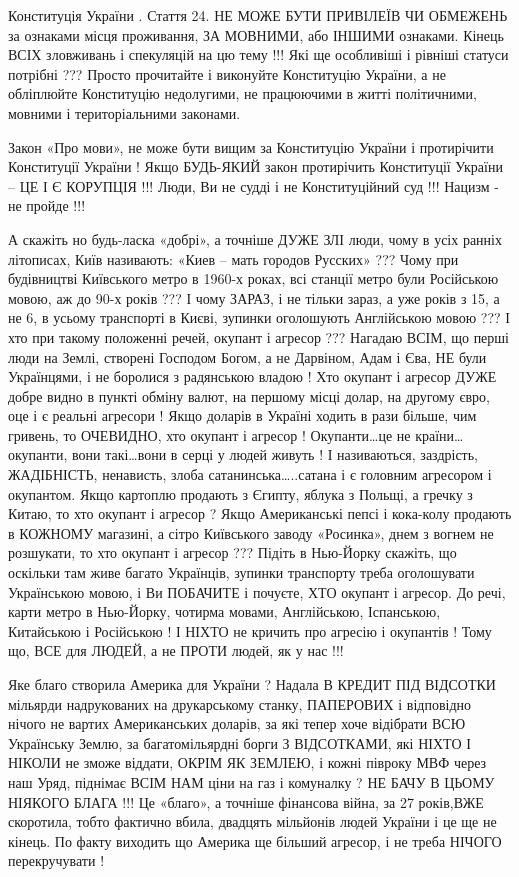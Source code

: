 \begin{itemize}
Конституція України . Стаття 24. НЕ МОЖЕ БУТИ ПРИВІЛЕЇВ ЧИ ОБМЕЖЕНЬ за ознаками
місця проживання, ЗА МОВНИМИ, або ІНШИМИ ознаками. Кінець ВСІХ зловживань і
спекуляцій на цю тему !!! Які ще особливіші і рівніші статуси потрібні ???
Просто прочитайте і виконуйте Конституцію України, а не обліплюйте Конституцію
недолугими, не працюючими в житті політичними, мовними і територіальними
законами.

Закон «Про мови», не може бути вищим за Конституцію України і протирічити
Конституції України ! Якщо БУДЬ-ЯКИЙ закон протирічить Конституції України – ЦЕ
І Є КОРУПЦІЯ !!! Люди, Ви не судді і не Конституційний суд !!! Нацизм - не
пройде !!!

А скажіть но будь-ласка «добрі», а точніше ДУЖЕ ЗЛІ люди, чому в усіх ранніх
літописах, Київ називають: «Киев – мать городов Русских» ??? Чому при
будівництві Київського метро в 1960-х роках, всі станції метро були Російською
мовою, аж до 90-х років ??? І чому ЗАРАЗ, і не тільки зараз, а уже років з 15,
а не 6, в усьому транспорті в Києві, зупинки оголошують Англійською мовою ??? І
хто при такому положенні речей, окупант і агресор ??? Нагадаю ВСІМ, що перші
люди на Землі, створені Господом Богом, а не Дарвіном, Адам і Єва, НЕ були
Українцями, і не боролися з радянською владою ! Хто окупант і агресор ДУЖЕ
добре видно в пункті обміну валют, на першому місці долар, на другому євро, оце
і є реальні агресори ! Якщо доларів в Україні ходить в рази більше, чим
гривень, то ОЧЕВИДНО, хто окупант і агресор ! Окупанти…це не країни…окупанти,
вони такі…вони в серці у людей живуть ! І називаються, заздрість, ЖАДІБНІСТЬ,
ненависть, злоба сатанинська…..сатана і є головним агресором і окупантом. Якщо
картоплю продають з Єгипту, яблука з Польщі, а гречку з Китаю, то хто окупант і
агресор ? Якщо Американські пепсі і кока-колу продають в КОЖНОМУ магазині, а
сітро Київського заводу «Росинка», днем з вогнем не розшукати, то хто окупант і
агресор ??? Підіть в Нью-Йорку скажіть, що оскільки там живе багато Українців,
зупинки транспорту треба оголошувати Українською мовою, і Ви ПОБАЧИТЕ і
почуєте, ХТО окупант і агресор. До речі, карти метро в Нью-Йорку, чотирма
мовами, Англійською, Іспанською, Китайською і Російською ! І НІХТО не кричить
про агресію і окупантів ! Тому що, ВСЕ для ЛЮДЕЙ, а не ПРОТИ людей, як у нас
!!!

Яке благо створила Америка для України ? Надала В КРЕДИТ ПІД ВІДСОТКИ мільярди
надрукованих на друкарському станку, ПАПЕРОВИХ і відповідно нічого не вартих
Американських доларів, за які тепер хоче відібрати ВСЮ Українську Землю, за
багатомільярдні борги З ВІДСОТКАМИ, які НІХТО І НІКОЛИ не зможе віддати, ОКРІМ
ЯК ЗЕМЛЕЮ, і кожні півроку МВФ через наш Уряд, піднімає ВСІМ НАМ ціни на газ і
комуналку ? НЕ БАЧУ В ЦЬОМУ НІЯКОГО БЛАГА !!! Це «благо», а точніше фінансова
війна, за 27 років,ВЖЕ скоротила, тобто фактично вбила, двадцять мільйонів
людей України і це ще не кінець. По факту виходить що Америка ще більший
агресор, і не треба НІЧОГО перекручувати !


\end{itemize}

